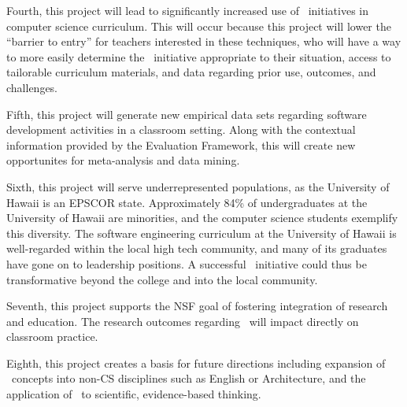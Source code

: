 Fourth, this project will lead to significantly increased use of \eCT\
initiatives in computer science curriculum.  This will occur because this
project will lower the ``barrier to entry'' for teachers interested in
these techniques, who will have a way to more easily determine the \eCT\
initiative appropriate to their situation, access to tailorable curriculum
materials, and data regarding prior use, outcomes, and challenges.

Fifth, this project will generate new empirical data sets regarding
software development activities in a classroom setting.  Along with the
contextual information provided by the Evaluation Framework, this will
create new opportunites for meta-analysis and data mining.  

Sixth, this project will serve underrepresented populations, as the
University of Hawaii is an EPSCOR state. Approximately 84\% of
undergraduates at the University of Hawaii are minorities, and the computer
science students exemplify this diversity.  The software engineering
curriculum at the University of Hawaii is well-regarded within the local
high tech community, and many of its graduates have gone on to leadership
positions. A successful \eCT\ initiative could thus be transformative
beyond the college and into the local community.

Seventh, this project supports the NSF goal of fostering integration of
research and education.  The research outcomes regarding \eCT\ will impact
directly on classroom practice.

Eighth, this project creates a basis for future directions including
expansion of \eCT\ concepts into non-CS disciplines such as English or
Architecture, and the application of \eCT\ to scientific, evidence-based
thinking.








 










